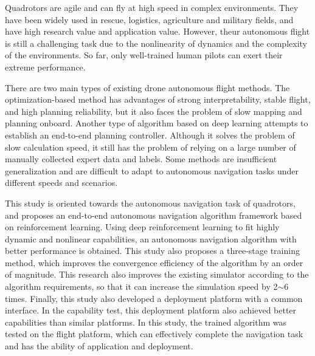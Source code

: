 \begin{abstract*}

  Quadrotors are agile and can fly at high speed in complex environments. They have been widely used in rescue, logistics, agriculture and military fields, and have high research value and application value. However, theur autonomous flight is still a challenging task due to the nonlinearity of dynamics and the complexity of the environments. So far, only well-trained human pilots can exert their extreme performance.

  There are two main types of existing drone autonomous flight methods. The optimization-based method has advantages of strong interpretability, stable flight, and high planning reliability, but it also faces the problem of slow mapping and planning onboard. Another type of algorithm based on deep learning attempts to establish an end-to-end planning controller. Although it solves the problem of slow calculation speed, it still has the problem of relying on a large number of manually collected expert data and labels. Some methods are insufficient generalization and are difficult to adapt to autonomous navigation tasks under different speeds and scenarios.

  This study is oriented towards the autonomous navigation task of quadrotors, and proposes an end-to-end autonomous navigation algorithm framework based on reinforcement learning. Using deep reinforcement learning to fit highly dynamic and nonlinear capabilities, an autonomous navigation algorithm with better performance is obtained. This study also proposes a three-stage training method, which improves the convergence efficiency of the algorithm by an order of magnitude. This research also improves the existing simulator according to the algorithm requirements, so that it can increase the simulation speed by 2$\sim$6 times. Finally, this study also developed a deployment platform with a common interface. In the capability test, this deployment platform also achieved better capabilities than similar platforms. In this study, the trained algorithm was tested on the flight platform, which can effectively complete the navigation task and has the ability of application and deployment.

\end{abstract*}
